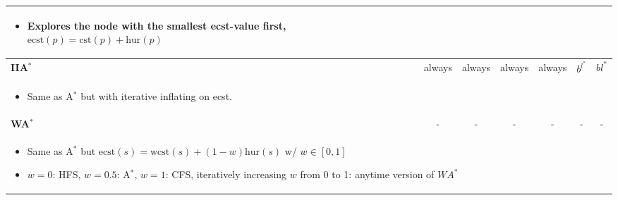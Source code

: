\begin{summary}
\begin{center}
\begin{tabular}{lcccccc}
{        \begin{itemize}
            \item Explores the node with the smallest ecst-value first, $\text{ecst}(p) = \text{cst}(p) + \text{hur}(p)$
        \end{itemize}} \\
        \midrule
        \textbf{IIA$^*$} & always & always & always & always & $b^{l^{*}}$ & $bl^{*} $ \\
        \multicolumn{7}{p{\linewidth}}{
        \begin{itemize}
            \item Same as A$^*$ but with iterative inflating on ecst.
        \end{itemize}} \\
        \midrule
        \textbf{WA$^*$} & - & - & - & - & - & - \\
        \multicolumn{7}{p{\linewidth}}{
            \begin{itemize}
                \item Same as A$^*$ but $\text{ecst}(s) = \text{wcst}(s) + (1-w)\text{hur}(s)$ w/ $w \in [0,1]$
                \item $w=0$: HFS, $w=0.5$: A$^*$, $w=1$: CFS, iteratively increasing $w$ from 0 to 1: anytime version of $WA^*$
            \end{itemize}} \\
        \bottomrule
        \end{tabular}
    \end{center}
\end{summary}
\newpage

